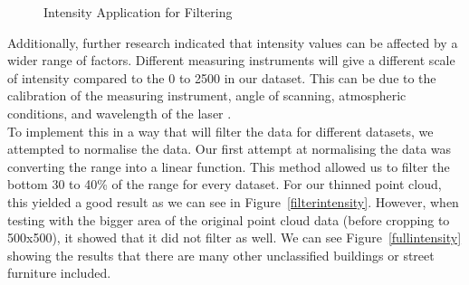 \documentclass{article}
\begin{document}
\begin{figure}[H]
    \centering
    \hspace{0.5cm}
    \caption{Intensity Application for Filtering}
    \label{fig:comparison}
\end{figure}

\noindent Additionally, further research indicated that intensity values can be affected by a wider range of factors. Different measuring instruments will give a different scale of intensity compared to the 0 to 2500 in our dataset. This can be due to the calibration of the measuring instrument, angle of scanning, atmospheric conditions, and wavelength of the laser .\\

\noindent To implement this in a way that will filter the data for different datasets, we attempted to normalise the data. Our first attempt at normalising the data was converting the range into a linear function. This method allowed us to filter the bottom 30 to 40\% of the range for every dataset. For our thinned point cloud, this yielded a good result as we can see in Figure~\ref{filterintensity}.  However, when testing with the bigger area of the original point cloud data (before cropping to 500x500), it showed that it did not filter as well. We can see Figure~\ref{fullintensity} showing the results that there are many other unclassified buildings or street furniture included.\\
\end{document}
